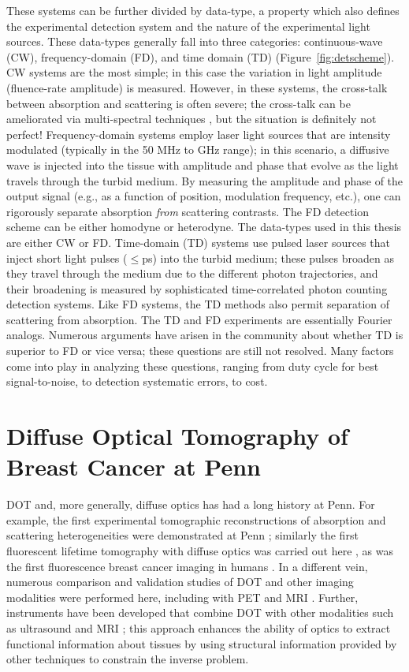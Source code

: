These systems can be further divided by data-type, a property which also defines the experimental detection system and the nature of the experimental light sources. These data-types generally fall into three categories: continuous-wave (CW), frequency-domain (FD), and time domain (TD) (Figure~\ref{fig:detscheme}). CW systems are the most simple; in this case the variation in light amplitude (fluence-rate amplitude) is measured.  However, in these systems, the cross-talk between absorption and scattering is often severe; the cross-talk can be ameliorated via multi-spectral techniques \cite{Corlu2003,Corlu2005}, but the situation is definitely not perfect! Frequency-domain systems employ laser light sources that are intensity modulated (typically in the 50 MHz to GHz range); in this scenario, a diffusive wave is injected into the tissue with amplitude and phase that evolve as the light travels through the turbid medium. By measuring the amplitude and phase of the output signal (e.g., as a function of position, modulation frequency, etc.), one can rigorously separate absorption \textit{from} scattering contrasts. The FD detection scheme can be either homodyne or heterodyne. The data-types used in this thesis are either CW or FD. Time-domain (TD) systems use pulsed laser sources that inject short light pulses ($\leq $ps) into the turbid medium; these pulses broaden as they travel through the medium due to the different photon trajectories, and their broadening is measured by sophisticated time-correlated photon counting detection systems. Like FD systems, the TD methods also permit separation of scattering from absorption. The TD and FD experiments are essentially Fourier analogs. Numerous arguments have arisen in the community about whether TD is superior to FD or vice versa; these questions are still not resolved. Many factors come into play in analyzing these questions, ranging from duty cycle for best signal-to-noise, to detection systematic errors, to cost. 

\section{Diffuse Optical Tomography of Breast Cancer at Penn}
DOT and, more generally, diffuse optics has had a long history at Penn. For example, the first experimental tomographic reconstructions of absorption and scattering heterogeneities were demonstrated at Penn \cite{OLeary1995}; similarly the first fluorescent lifetime tomography with diffuse optics was carried out here \cite{OLeary1996}, as was the first fluorescence breast cancer imaging in humans \cite{Corlu2007}. In a different vein, numerous comparison and validation studies of DOT and other imaging modalities were performed here, including with PET \cite{Konecky2008b} and MRI \cite{Choe2005a}. Further, instruments have been developed that combine DOT with other modalities such as ultrasound \cite{Zhu1999,Holboke2000} and MRI \cite{Ntziachristos1999, Ntziachristos2000,Ntziachristos2001,Ntziachristos2002}; this approach enhances the ability of optics to extract functional information about tissues by using structural information provided by other techniques to constrain the inverse problem. 

